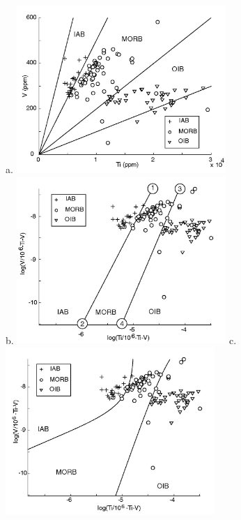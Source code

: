 \begin{figure}[htbp]
  \centering
a.  \includegraphics[width=300]{figures/Shervais.jpg}\\
b.  \includegraphics[width=300]{figures/log_Ti_V_lin.jpg}
c.  \includegraphics[width=300]{figures/log_Ti_V_q.jpg}

\end{figure}
